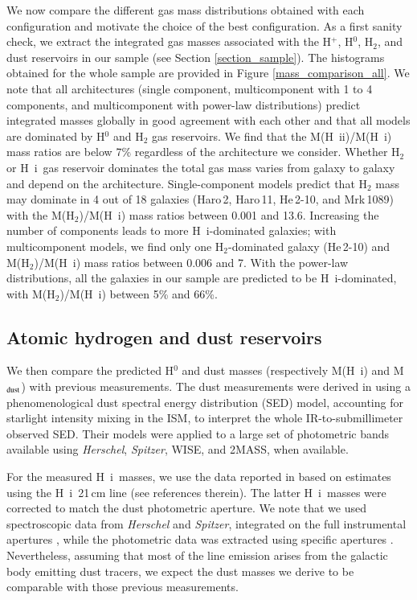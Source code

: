 \documentclass{aa}
\newcommand{\toadd}[1]{{\color{red}{{[TO ADD: \bf #1]}}}}
\newcommand{\hi}{H~{\sc i}}
\newcommand{\hii}{H~{\sc ii}}
\begin{document}
We now compare the different gas mass distributions obtained with each configuration and motivate the choice of the best configuration. As a first sanity check, we extract the integrated gas masses associated with the H$^+$, H$^0$, H$_2$, and dust reservoirs in our sample (see Section \ref{section_sample}). The histograms obtained for the whole sample are provided in Figure \ref{mass_comparison_all}. We note that all architectures (single component, multicomponent with 1 to 4 components, and multicomponent with power-law distributions) predict integrated masses globally in good agreement with each other and that all models are dominated by H$^0$ and H$_2$ gas reservoirs. We find that the M(\hii)/M(\hi) mass ratios are below 7\% regardless of the architecture we consider. Whether H$_2$ or \hi\ gas reservoir dominates the total gas mass varies from galaxy to galaxy and depend on the architecture. Single-component models predict that H$_2$ mass may dominate in 4 out of 18 galaxies (Haro\,2, Haro\,11, He\,2-10, and Mrk\,1089) with the M(H$_2$)/M(\hi) mass ratios between 0.001 and 13.6. Increasing the number of components leads to more \hi-dominated galaxies; with multicomponent models, we find only one H$_2$-dominated galaxy (He\,2-10) and M(H$_2$)/M(\hi) mass ratios between 0.006 and 7. With the power-law distributions, all the galaxies in our sample are predicted to be \hi-dominated, with M(H$_2$)/M(\hi) between 5\% and 66\%.

\subsection{Atomic hydrogen and dust reservoirs}
\label{subsect_masses}

We then compare the predicted H$^0$ and dust masses (respectively M(\hi) and M$_{\rm dust}$) with previous measurements. The dust measurements were derived in \cite{remy-ruyer_linking_2015} using a phenomenological dust spectral energy distribution (SED) model, accounting for starlight intensity mixing in the ISM, to interpret the whole IR-to-submillimeter observed SED. Their models were applied to a large set of photometric bands available using \textit{Herschel}, \textit{Spitzer}, WISE, and 2MASS, when available. 

For the measured \hi\ masses, we use the data reported in \cite{remy-ruyer_gas--dust_2014} based on estimates using the \hi\ 21\,cm line (see references therein). The latter \hi\ masses were corrected to match the dust photometric aperture. We note that we used spectroscopic data from \textit{Herschel} and \textit{Spitzer}, integrated on the full instrumental apertures \citep{Cormier_2015}, while the photometric data was extracted using specific apertures \citep[see][]{Remy-Ruyer_2013}. Nevertheless, assuming that most of the line emission arises from the galactic body emitting dust tracers, we expect the dust masses we derive to be comparable with those previous measurements.
\end{document}
